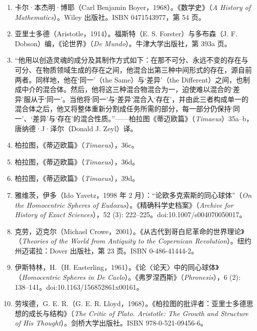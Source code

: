 \begin{enumerate}
\item 卡尔·本杰明·博耶（Carl Benjamin Boyer，1968）。《数学史》（\emph{A History of Mathematics}）。Wiley 出版社。ISBN 0471543977，第 54 页。  

\item 亚里士多德（Aristotle，1914）。福斯特（E. S. Forster）与多布森（J. F. Dobson）编，《论世界》（\emph{De Mundo}）。牛津大学出版社，第 393a 页。  

\item “他用以创造灵魂的成分及其制作方式如下：在那不可分、永远不变的存在与可分、在物质领域生成的存在之间，他混合出第三种中间形式的存在，源自前两者。同样地，他在‘同一’（the Same）与‘差异’（the Different）之间，也制成中介的混合体。然后，他将这三种混合物混合为一，迫使难以混合的‘差异’服从于‘同一’。当他将‘同一’与‘差异’混合入‘存在’，并由此三者构成单一的混合体之后，他又将整体重新分割成任务所需的部分，每一部分仍保持‘同一’、‘差异’与‘存在’的混合性质。”——柏拉图《蒂迈欧篇》（\emph{Timaeus}）35a–b，唐纳德·J·泽尔（Donald J. Zeyl）译。  

\item 柏拉图，《蒂迈欧篇》（\emph{Timaeus}），36c。  
\item 柏拉图，《蒂迈欧篇》（\emph{Timaeus}），36d。  
\item 柏拉图，《蒂迈欧篇》（\emph{Timaeus}），39d。  

\item 雅维茨，伊多（Ido Yavetz，1998 年 2 月）：“论欧多克索斯的同心球体”（\emph{On the Homocentric Spheres of Eudoxus}）。《精确科学史档案》（\emph{Archive for History of Exact Sciences}），52 (3): 222–225。doi:10.1007/s004070050017。  

\item 克劳，迈克尔（Michael Crowe，2001）。《从古代到哥白尼革命的世界理论》（\emph{Theories of the World from Antiquity to the Copernican Revolution}）。纽约州迈诺拉：Dover 出版社，第 23 页。ISBN 0-486-41444-2。  

\item 伊斯特林，H.（H. Easterling，1961）。《论〈论天〉中的同心球体》（\emph{Homocentric Spheres in De Caelo}）。《弗罗涅西斯》（\emph{Phronesis}），6 (2): 138–141。doi:10.1163/156852861x00161。  

\item 劳埃德，G. E. R.（G. E. R. Lloyd，1968）。《柏拉图的批评者：亚里士多德思想的成长与结构》（\emph{The Critic of Plato. Aristotle: The Growth and Structure of His Thought}）。剑桥大学出版社。ISBN 978-0-521-09456-6。  


\end{enumerate}
